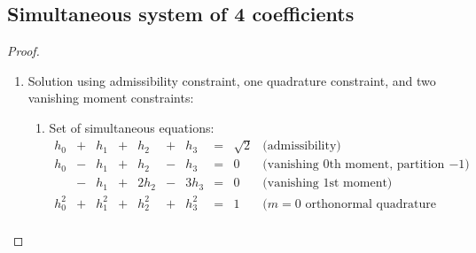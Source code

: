 \subsection {Simultaneous system of 4 coefficients}
\label{sec:sim_four}
\begin{proof}
\begin{enumerate}

\item Solution using admissibility constraint, one quadrature constraint, and two vanishing moment constraints:

\begin{enumerate}
\item Set of simultaneous equations:
\[\begin{array}{*{9}{r}l}
  h_0      &+& h_1      &+& h_2   &+& h_3   &=& \sqrt{2}      
  &\text{(admissibility)} \\
  h_0      &-& h_1      &+& h_2   &-& h_3   &=& 0          
  &\text{(vanishing 0th moment, partition of unity, zero at $-1$)} \\
           &-& h_1      &+& 2h_2  &-&3h_3   &=& 0
  &\text{(vanishing 1st moment)} \\
  h_0^2    &+& h_1^2    &+& h_2^2 &+& h_3^2 &=& 1                  
  &\text{($m=0$ orthonormal quadrature condition)} \\
\end{array}\]


\end{enumerate}
\end{enumerate}
\end{proof}
